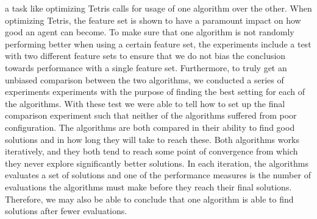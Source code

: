 a task like optimizing Tetris calls for usage of one algorithm over the other.
When optimizing Tetris, the feature set is shown to have a paramount impact on
how good an agent can become. To make sure that one algorithm is not randomly performing
better when using a certain feature set, the experiments include a test with two different 
feature sets to ensure that we do not bias the conclusion towards performance with a 
single feature set. Furthermore, to truly get an unbiased comparison between the two 
algorithms, we conducted a series of experiments experiments with the purpose of finding
the best setting for each of the algorithms. With these test we were able to 
tell how to set up the final comparison experiment such that neither of the
algorithms suffered from poor configuration. The algorithms are both 
compared in their ability to find good solutions and in how long they will 
take to reach these. Both algorithms works iteratively, and they both tend to
reach some point of convergence from which they never explore significantly better 
solutions. In each iteration, the algorithms evaluates a set of solutions and one of the
performance measures is the number of evaluations the algorithms must make 
before they reach their final solutions. Therefore, we may also be able to conclude 
that one algorithm is able to find solutions after fewer evaluations.




